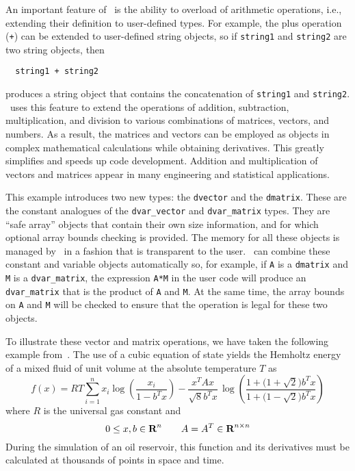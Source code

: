 \documentclass{admbmanual}
\begin{document}
An important feature of \cplus\ is the ability to overload of arithmetic operations, i.e.,  extending their
definition to user-defined types. For example, the plus operation (\texttt{+})
can be extended to user-defined string objects, so if
\texttt{string1} and \texttt{string2} are two string objects, then
\begin{lstlisting}
  string1 + string2
\end{lstlisting}
produces a string object that contains
the concatenation of \texttt{string1} and \texttt{string2}. 
 \scAD\ uses this feature to extend
the operations of addition, subtraction, multiplication, and division 
to various combinations of matrices, vectors, and numbers.
As a result, the matrices and vectors can be employed as
objects in complex mathematical calculations while obtaining derivatives.  This greatly simplifies and speeds up
code development.
Addition and multiplication of vectors and matrices appear 
in many engineering and statistical applications.

  
This example introduces two new types: the \texttt{dvector} and the 
\texttt{dmatrix}. These are the constant analogues of the \texttt{dvar\_vector}
and \texttt{dvar\_matrix} types. They are ``safe array''
objects that
contain their own size information, and for which optional array 
bounds checking is provided.
The memory  for all these objects is
managed by \scAD\ in a fashion that is transparent to the
user. \scAD\ can combine these constant and variable objects automatically 
so, for example, if \texttt{A} is a \texttt{dmatrix} and \texttt{M}
 is a \texttt{dvar\_matrix}, the expression \texttt{A*M} in the user code
will produce an \texttt{dvar\_matrix} that is the product of \texttt{A} and
\texttt{M}. At the same time, the array bounds on \texttt{A} and \texttt{M}
will be checked to ensure that the operation is legal for these two
objects.     
 

To illustrate these vector and matrix operations, we have taken the following 
example from~\cite{griewank1988}.
The use of a cubic equation of state yields the 
Hemholtz energy
of a mixed fluid of unit volume at the absolute temperature $T$ as
\begin{equation*}
  f(x)=RT\sum_{i=1}^n x_i \log\left(\frac{x_i}{1-b^Tx}\right)
-\frac{x^TAx}{\sqrt{8}b^Tx} 
   \,\log\left(%
       \frac{1+\big(1+\sqrt{2}\big)b^Tx}%
               {1+\big(1-\sqrt{2}\big)b^Tx}\right)
\end{equation*}
where $R$ is the universal gas constant and
\begin{equation*}
  0\le x,b \in {\mbox{\bf R}}^n\qquad 
                      A=A^T\in {\mbox{\bf R}}^{n\times n}
\end{equation*}
During the simulation of an oil reservoir, this function and its
derivatives must be calculated at thousands of points in space and time.
\end{document}
